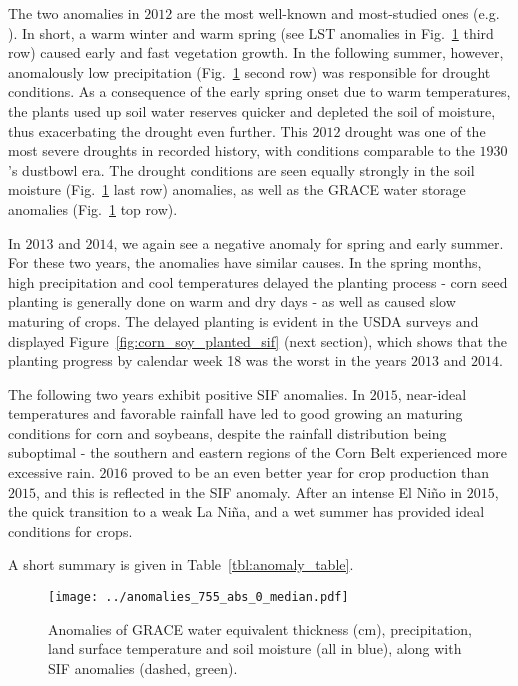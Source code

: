 \documentclass[preprint, a4paper, 10pt, times]{elsarticle}
\begin{document}
The two anomalies in $2012$ are the most well-known and most-studied ones (e.g. \citet{wolf2016warm}). In short, a warm winter and warm spring (see LST anomalies in Fig.~\ref{fig:anomalies_0} third row) caused early and fast vegetation growth. In the following summer, however, anomalously low precipitation (Fig.~\ref{fig:anomalies_0} second row) was responsible for drought conditions. As a consequence of the early spring onset due to warm temperatures, the plants used up soil water reserves quicker and depleted the soil of moisture, thus exacerbating the drought even further. This $2012$ drought was one of the most severe droughts in recorded history, with conditions comparable to the $1930$'s dustbowl era. The drought conditions are seen equally strongly in the soil moisture (Fig.~\ref{fig:anomalies_0} last row) anomalies, as well as the GRACE water storage anomalies (Fig.~\ref{fig:anomalies_0} top row). 

In $2013$ and $2014$, we again see a negative anomaly for spring and early summer. For these two years, the anomalies have similar causes. In the spring months, high precipitation and cool temperatures delayed the planting process - corn seed planting is generally done on warm and dry days - as well as caused slow maturing of crops. The delayed planting is evident in the USDA surveys and displayed Figure~\ref{fig:corn_soy_planted_sif} (next section), which shows that the planting progress by calendar week 18 was the worst in the years $2013$ and $2014$. 

The following two years exhibit positive SIF anomalies. In $2015$, near-ideal temperatures and favorable rainfall have led to good growing an maturing conditions for corn and soybeans, despite the rainfall distribution being suboptimal - the southern and eastern regions of the Corn Belt experienced more excessive rain. $2016$ proved to be an even better year for crop production than $2015$, and this is reflected in the SIF anomaly. After an intense El Ni\~no in $2015$, the quick transition to a weak La Ni\~na, and a wet summer has provided ideal conditions for crops.

A short summary is given in Table~\ref{tbl:anomaly_table}.

\begin{figure}[htbp]
\centering
\texttt{[image: ../anomalies\_755\_abs\_0\_median.pdf]}
\caption{Anomalies of GRACE water equivalent thickness (cm), precipitation, land surface temperature and soil moisture (all in blue), along with SIF anomalies (dashed, green).}
\label{fig:anomalies_0}
\end{figure}
\end{document}
